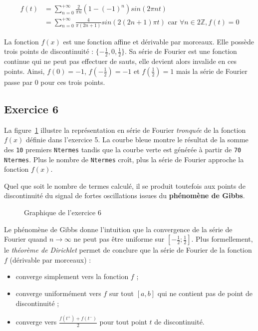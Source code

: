 \documentclass[a4paper,11pt]{article}
\theoremstyle{nonumberplain}
\theoremstyle{nonumberplain}
\begin{document}
    \begin{equation*}
        \begin{split}
            f(t)    & = \sum\limits_{n = 0}^{+ \infty}\frac{2}{\pi n}(1 - (-1)^n)sin(2 \pi n t) \\
                    & = \sum\limits_{n = 0}^{+ \infty}\frac{4}{\pi (2n+1)}sin(2 (2n+1) \pi t) \text{ car } \forall n \in 2 \mathbb{Z}, f(t) = 0
        \end{split}
    \end{equation*}

    La fonction $f(x)$ est une fonction affine et dérivable par morceaux. Elle possède trois points de discontinuité : $\{-\frac{1}{2}, 0, \frac{1}{2}\}$.
    Sa série de Fourier est une fonction continue qui ne peut pas effectuer de \og sauts\fg, elle devient alors invalide en ces points.
    Ainsi, $f(0) = -1$, $f(-\frac{1}{2}) = -1$ et $f(\frac{1}{2}) = 1$ mais la série de Fourier passe par $0$ pour ces trois points.


\subsection*{Exercice 6}

    La figure~\ref{graph_exo6} illustre la représentation en série de Fourier \textit{tronquée} de la fonction $f(x)$ définie dans l'exercice 5.
    La courbe bleue montre le résultat de la somme des \texttt{10} premiers \texttt{Ntermes} tandis que la courbe verte est générée à partir de \texttt{70 Ntermes}.
    Plus le nombre de \texttt{Ntermes} croît, plus la série de Fourier approche la fonction $f(x)$.

    Quel que soit le nombre de termes calculé, il se produit toutefois aux points de discontinuité
    du signal de fortes oscillations issues du \textbf{phénomène de Gibbs}.

    \begin{figure}[H]
        \caption{\label{graph_exo6} Graphique de l'exercice 6}
    \end{figure}

    Le phénomène de Gibbs donne l'intuition que la convergence de la série de Fourier quand $n \rightarrow \infty$ ne peut pas être uniforme sur $[-\frac{1}{2}; \frac{1}{2}]$.
    Plus formellement, le \textit{théorème de Dirichlet} permet de conclure que la série de Fourier de la fonction $f$ (dérivable par morceaux) :

    \begin{itemize}
        \item
        converge simplement vers la fonction $f$ ;

        \item
        converge uniformément vers $f$ sur tout $[a, b]$ qui ne contient pas de point de discontinuité ;

        \item
        converge vers $ \frac{f(t^{+}) + f(t^{-})}{2}$ pour tout point $t$ de discontinuité.
    \end{itemize}
\end{document}
